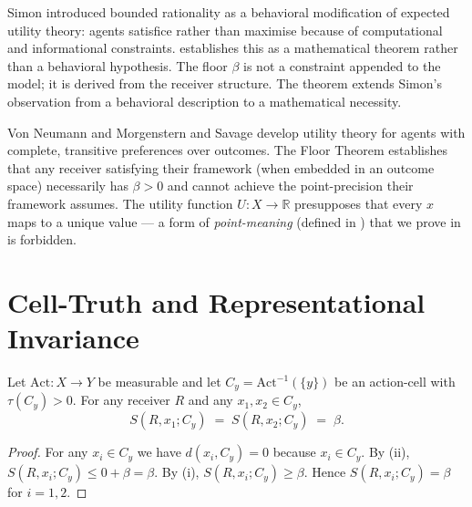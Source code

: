 \documentclass[twocolumn,11pt,a4paper]{article}
\newcommand{\R}{\mathbb{R}}
\newcommand{\Action}{\mathrm{Act}}
\begin{document}
\begin{remark}
\label{rem:simon}
Simon \cite{simon1955,simon1957} introduced bounded rationality as a
behavioral modification of expected utility theory: agents satisfice
rather than maximise because of computational and informational
constraints.   establishes this as a
mathematical theorem rather than a behavioral hypothesis.  The floor
$\beta$ is not a constraint appended to the model; it is derived from the
receiver structure.  The theorem extends Simon's observation from a
behavioral description to a mathematical necessity.
\end{remark}

\begin{remark}
\label{rem:eurel}
Von Neumann and Morgenstern \cite{vnm1944} and Savage \cite{savage1954}
develop utility theory for agents with complete, transitive preferences
over outcomes.  The Floor Theorem establishes that any receiver
satisfying their framework (when embedded in an outcome space) necessarily
has $\beta>0$ and cannot achieve the point-precision their framework
assumes.  The utility function $U\colon X\to\R$ presupposes that every
$x$ maps to a unique value — a form of \emph{point-meaning} (defined in
) that we prove in  is
forbidden.
\end{remark}

\section{Cell-Truth and Representational Invariance}
\label{sec:celltruth}

\begin{theorem}
\label{thm:celltruth}
Let $\Action\colon X\to Y$ be measurable and let $C_y=\Action^{-1}(\{y\})$
be an action-cell with $\tau(C_y)>0$.  For any receiver $R$ and any
$x_1,x_2\in C_y$,
\[
  S(R,x_1;C_y)\;=\;S(R,x_2;C_y)\;=\;\beta.
\]
\end{theorem}

\begin{proof}
For any $x_i\in C_y$ we have $d(x_i,C_y)=0$ because $x_i\in C_y$.
By (ii), $S(R,x_i;C_y)\leq 0+\beta=\beta$.
By (i), $S(R,x_i;C_y)\geq\beta$.
Hence $S(R,x_i;C_y)=\beta$ for $i=1,2$.
\end{proof}
\end{document}
